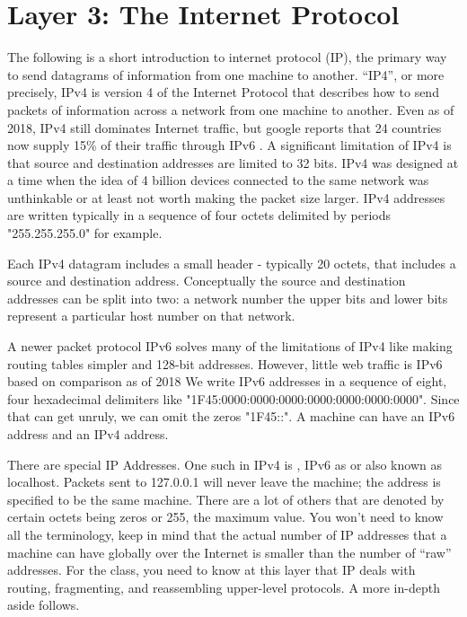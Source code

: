 \section{Layer 3: The Internet Protocol}

The following is a short introduction to internet protocol (IP), the primary way to send datagrams of information from one machine to another.
``IP4'', or more precisely, \gls{IPv4} is version 4 of the Internet Protocol that describes how to send \gls{packets} of information across a network from one machine to another.
Even as of 2018, IPv4 still dominates Internet traffic, but google reports that 24 countries now supply 15\% of their traffic through IPv6 \cite{internet_society_2018}.
A significant limitation of IPv4 is that source and destination addresses are limited to 32 bits.
IPv4 was designed at a time when the idea of 4 billion devices connected to the same network was unthinkable or at least not worth making the packet size larger.
\gls{IPv4 addresses} are written typically in a sequence of four octets delimited by periods "255.255.255.0" for example.

Each IPv4 \gls{datagram} includes a small header - typically 20 \gls{octets}, that includes a source and destination address.
Conceptually the source and destination addresses can be split into two: a network number the upper bits and lower bits represent a particular host number on that network.

A newer packet protocol \gls{IPv6} solves many of the limitations of IPv4 like making routing tables simpler and 128-bit addresses.
However, little web traffic is IPv6 based on comparison as of 2018 \cite{internet_society_2018}
We write IPv6 addresses in a sequence of eight, four hexadecimal delimiters like "1F45:0000:0000:0000:0000:0000:0000:0000".
Since that can get unruly, we can omit the zeros "1F45::". A machine can have an IPv6 address and an IPv4 address.

There are special IP Addresses.
One such in IPv4 is , IPv6 as  or  also known as localhost.
Packets sent to 127.0.0.1 will never leave the machine; the address is specified to be the same machine.
There are a lot of others that are denoted by certain octets being zeros or 255, the maximum value. You won't need to know all the terminology, keep in mind that the actual number of IP addresses that a machine can have globally over the Internet is smaller than the number of ``raw'' addresses.
For the class, you need to know at this layer that IP deals with routing, fragmenting, and reassembling upper-level protocols. A more in-depth aside follows.


